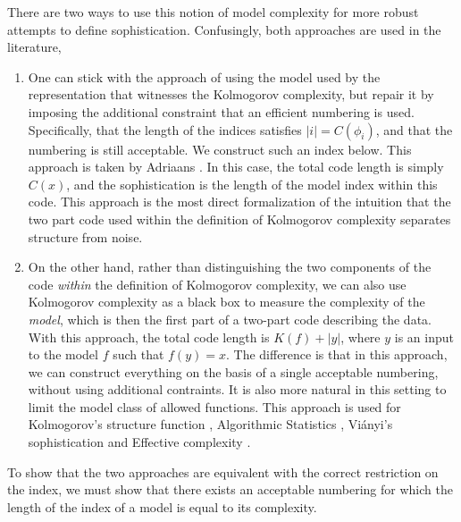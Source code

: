 \documentclass{style/llncs}
\begin{document}
There are two ways to use this notion of model complexity for more robust attempts to define sophistication. Confusingly, both approaches are used in the literature,
\begin{enumerate}
  \item One can stick with the approach of using the model used by the representation that witnesses the Kolmogorov complexity, but repair it by imposing the additional constraint that an efficient numbering is used. Specifically, that the length of the indices satisfies $|i| = C(\phi_i)$, and that the numbering is still acceptable. We construct such an index below. This approach is taken by Adriaans \cite{adriaans2012facticity}. In this case, the total code length is simply $C(x)$, and the sophistication is the length of the model index within this code. This approach is the most direct formalization of the intuition that the two part code used within the definition of Kolmogorov complexity separates structure from noise.
  \item On the other hand, rather than distinguishing the two components of the code \emph{within} the definition of Kolmogorov complexity, we can also use Kolmogorov complexity as a black box to measure the complexity of the \emph{model}, which is then the first part of a two-part code describing the data. With this approach, the total code length is $K(f)+|y|$, where $y$ is an input to the model $f$ such that $f(y)=x$. The difference is that in this approach, we can construct everything on the basis of a single acceptable numbering, without using additional contraints. It is also more natural in this setting to limit the model class of allowed functions. This approach is used for Kolmogorov's structure function \cite{cover1985kolmogorov}, Algorithmic Statistics \cite{gacs2001algorithmic}, Vi\'anyi's sophistication \cite{vitanyi2004meaningful} and Effective complexity \cite{gellmann1996information}.
\end{enumerate}

To show that the two approaches are equivalent with the correct restriction on the index, we must show that there exists an acceptable numbering for which the length of the index of a model is equal to its complexity.
\end{document}
